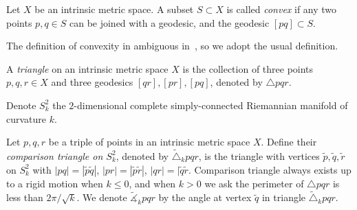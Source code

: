 \begin{defn}
    Let $X$ be an intrinsic metric space.
    A subset $S\subset X$ is called \emph{convex} if any two points $p,q\in S$ can be joined with a geodesic, and the geodesic $[pq]\subset S$.
\end{defn}

\begin{rem}
    The definition of convexity in ambiguous in~\cite{buragoADAlexandrovSpaces1992}, so we adopt the usual definition.
\end{rem}

\begin{defn}
    A \emph{triangle} on an intrinsic metric space $X$ is the collection of three points $p,q,r\in X$ and three geodesics $[qr],[pr],[pq]$, denoted by $\triangle pqr$.
\end{defn}

\begin{nota}
    Denote $S^2_k$ the $2$-dimensional complete simply-connected Riemannian manifold of curvature $k$.
\end{nota}

\begin{defn}
    Let $p,q,r$ be a triple of points in an intrinsic metric space $X$.
    Define their \emph{comparison triangle on $S^2_k$}, denoted by $\tilde{\triangle}_kpqr$, is the triangle with vertices $\tilde{p},\tilde{q},\tilde{r}$ on $S^2_k$ with $|pq|=|\tilde{p}\tilde{q}|$, $|pr|=|\tilde{p}\tilde{r}|$, $|qr|=|\tilde{q}\tilde{r}$.
    Comparison triangle always exists up to a rigid motion when $k\leq 0$, and when $k>0$ we ask the perimeter of $\triangle{pqr}$ is less than $2\pi/\sqrt{k}$.
    We denote $\tilde{\measuredangle}_kpqr$ by the angle at vertex $\tilde{q}$ in triangle $\tilde{\triangle}_kpqr$.
\end{defn}